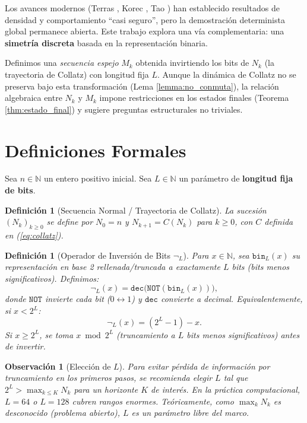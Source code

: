 \documentclass[11pt,a4paper]{article}
\newtheorem{definition}[theorem]{Definición}
\newtheorem{remark}[theorem]{Observación}
\begin{document}
Los avances modernos (Terras \cite{terras}, Korec \cite{korec}, Tao \cite{tao}) han establecido resultados de densidad y comportamiento ``casi seguro'', pero la demostración determinista global permanece abierta. Este trabajo explora una vía complementaria: una \textbf{simetría discreta} basada en la representación binaria.

Definimos una \textit{secuencia espejo} $M_k$ obtenida invirtiendo los bits de $N_k$ (la trayectoria de Collatz) con longitud fija $L$. Aunque la dinámica de Collatz no se preserva bajo esta transformación (Lema \ref{lemma:no_conmuta}), la relación algebraica entre $N_k$ y $M_k$ impone restricciones en los estados finales (Teorema \ref{thm:estado_final}) y sugiere preguntas estructurales no triviales.

\section{Definiciones Formales}
\label{sec:defs}

Sea $n \in \mathbb{N}$ un entero positivo inicial. Sea $L \in \mathbb{N}$ un parámetro de \textbf{longitud fija de bits}.

\begin{definition}[Secuencia Normal / Trayectoria de Collatz]
La sucesión $(N_k)_{k \ge 0}$ se define por $N_0 = n$ y $N_{k+1} = C(N_k)$ para $k \ge 0$, con $C$ definida en (\ref{eq:collatz}).
\end{definition}

\begin{definition}[Operador de Inversión de Bits $\neg_L$]
\label{def:inversion}
Para $x \in \mathbb{N}$, sea $\mathtt{bin}_L(x)$ su representación en base 2 rellenada/truncada a exactamente $L$ bits (bits menos significativos). Definimos:
\[
\neg_L(x) = \mathtt{dec}\big( \mathtt{NOT}(\mathtt{bin}_L(x)) \big),
\]
donde $\mathtt{NOT}$ invierte cada bit ($0 \leftrightarrow 1$) y $\mathtt{dec}$ convierte a decimal. Equivalentemente, si $x < 2^L$:
\[
\neg_L(x) = (2^L - 1) - x.
\]
Si $x \ge 2^L$, se toma $x \bmod 2^L$ (truncamiento a $L$ bits menos significativos) antes de invertir.
\end{definition}

\begin{remark}[Elección de $L$]
Para evitar pérdida de información por truncamiento en los primeros pasos, se recomienda elegir $L$ tal que $2^L > \max_{k \le K} N_k$ para un horizonte $K$ de interés. En la práctica computacional, $L=64$ o $L=128$ cubren rangos enormes. Teóricamente, como $\max_k N_k$ es desconocido (problema abierto), $L$ es un parámetro libre del marco.
\end{remark}
\end{document}

